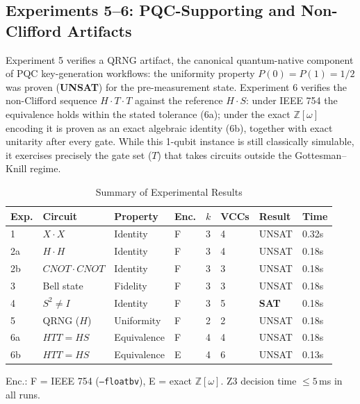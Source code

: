\documentclass[journal]{IEEEtran} %
\begin{document}
\subsection{Experiments 5--6: PQC-Supporting and Non-Clifford Artifacts}
Experiment 5 verifies a QRNG artifact, the canonical quantum-native component of PQC key-generation workflows: the uniformity property $P(0) = P(1) = 1/2$ was proven (\textbf{UNSAT}) for the pre-measurement state. Experiment 6 verifies the non-Clifford sequence $H \cdot T \cdot T$ against the reference $H \cdot S$: under IEEE 754 the equivalence holds within the stated tolerance (6a); under the exact $\mathbb{Z}[\omega]$ encoding it is proven as an exact algebraic identity (6b), together with exact unitarity after every gate. While this 1-qubit instance is still classically simulable, it exercises precisely the gate set ($T$) that takes circuits outside the Gottesman--Knill regime.

\begin{table}[!t]
\centering
\caption{Summary of Experimental Results}
\label{tab:results}
\footnotesize
\setlength{\tabcolsep}{3.0pt}
\begin{tabular}{@{}llllllll@{}}
\toprule
\textbf{Exp.} & \textbf{Circuit} & \textbf{Property} & \textbf{Enc.} & \textbf{$k$} & \textbf{VCCs} & \textbf{Result} & \textbf{Time} \\
\midrule
1  & $X \cdot X$        & Identity    & F & 3 & 4 & UNSAT & 0.32s \\
2a & $H \cdot H$        & Identity    & F & 3 & 4 & UNSAT & 0.18s \\
2b & $CNOT \cdot CNOT$  & Identity    & F & 3 & 3 & UNSAT & 0.18s \\
3  & Bell state         & Fidelity    & F & 3 & 3 & UNSAT & 0.18s \\
4  & $S^2 \neq I$       & Identity    & F & 3 & 5 & \textbf{SAT} & 0.18s \\
5  & QRNG ($H$)         & Uniformity  & F & 2 & 2 & UNSAT & 0.18s \\
6a & $H T T = H S$      & Equivalence & F & 4 & 4 & UNSAT & 0.18s \\
6b & $H T T = H S$      & Equivalence & E & 4 & 6 & UNSAT & 0.13s \\
\bottomrule
\end{tabular}

\vspace{2pt}
\raggedright\scriptsize Enc.: F = IEEE 754 (\texttt{--floatbv}), E = exact $\mathbb{Z}[\omega]$. Z3 decision time $\leq 5$\,ms in all runs.
\end{table}
\end{document}
